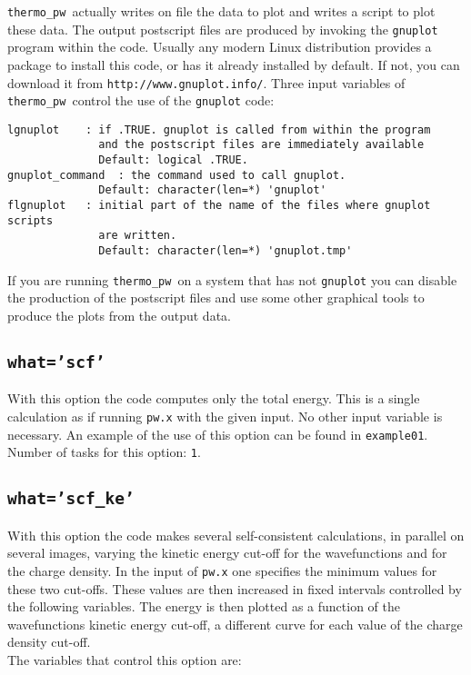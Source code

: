 \documentclass[12pt,a4paper]{article}
\def\thermo{\texttt{thermo\_pw}}
\begin{document}
\thermo\ actually writes on file the data to plot and writes a script to plot
these data. The output postscript files are produced by invoking the 
\texttt{gnuplot} program within the code. Usually any modern Linux 
distribution provides a package to install this code, or has it already 
installed by default. If not, you can download it from 
\texttt{http://www.gnuplot.info/}. Three input variables of \thermo\ control 
the use of the \texttt{gnuplot} code:

\begin{verbatim}
lgnuplot    : if .TRUE. gnuplot is called from within the program
              and the postscript files are immediately available
              Default: logical .TRUE.
gnuplot_command  : the command used to call gnuplot.
              Default: character(len=*) 'gnuplot'
flgnuplot   : initial part of the name of the files where gnuplot scripts 
              are written.
              Default: character(len=*) 'gnuplot.tmp'
\end{verbatim}
If you are running \thermo\ on a system that has not \texttt{gnuplot}
you can disable the production of the postscript files and use some other
graphical tools to produce the plots from the output data. 


\subsection{\texttt{what='scf'}}
With this option the code computes only the total energy. This is a single
calculation as if running \texttt{pw.x} with the given input.
No other input variable is necessary.
An example of the use of this option can be found in \texttt{example01}. \\
Number of tasks for this option: \texttt{1}.

\subsection{\texttt{what='scf\_ke'}}
With this option the code makes several self-consistent calculations, 
in parallel on several images, varying the kinetic energy cut-off for 
the wavefunctions and for the charge density. 
In the input of \texttt{pw.x} one specifies the minimum values for these two 
cut-offs. These values are then increased in fixed intervals controlled by the 
following variables. The energy is then plotted as a function of the 
wavefunctions kinetic energy cut-off, a different curve for each value of 
the charge density cut-off. \\
The variables that control this option are:
\end{document}
